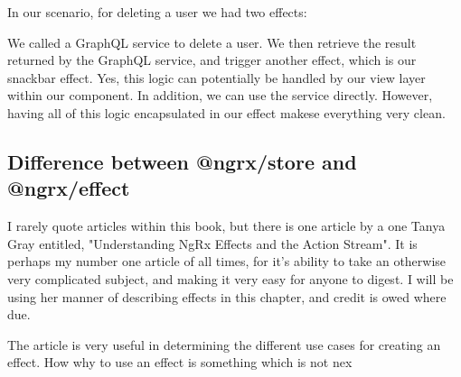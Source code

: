 In our scenario, for deleting a user we had two effects:

We called a GraphQL service to delete a user. We then retrieve the result
returned by the GraphQL service, and trigger another effect, which is our
snackbar effect. Yes, this logic can potentially be handled by our view layer
within our component. In addition, we can use the service directly. However,
having all of this logic encapsulated in our effect makese everything very clean.

\subsection{Difference between @ngrx/store and @ngrx/effect}
I rarely quote articles within this book, but there is one article by a one
Tanya Gray entitled, "Understanding NgRx Effects and the Action Stream". It is
perhaps my number one article of all times, for it's ability to take an
otherwise very complicated subject, and making it very easy for anyone to
digest. I will be using her manner of describing effects in this chapter, and
credit is owed where due.

The article is very useful in determining the different use cases for creating
an effect. How why to use an effect is something which is not nex
